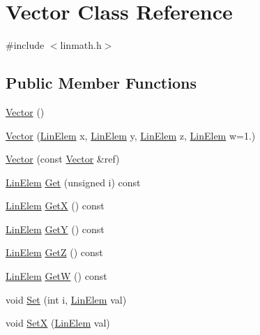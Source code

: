 \hypertarget{a00152}{\section{Vector Class Reference}
\label{a00152}
}


{\ttfamily \#include $<$linmath.\-h$>$}

\subsection*{Public Member Functions}
\begin{DoxyCompactItemize}
\item 
\hyperlink{a00152_a6f80c73b5f18dcf3f8e36065bdc8b9e5}{Vector} ()
\item 
\hyperlink{a00152_ae36366ccb7fe09f47ef0e3aa107d3c81}{Vector} (\hyperlink{a00234_a4f6e9fb2a8330a392e7819d1aef8881a}{Lin\-Elem} x, \hyperlink{a00234_a4f6e9fb2a8330a392e7819d1aef8881a}{Lin\-Elem} y, \hyperlink{a00234_a4f6e9fb2a8330a392e7819d1aef8881a}{Lin\-Elem} z, \hyperlink{a00234_a4f6e9fb2a8330a392e7819d1aef8881a}{Lin\-Elem} w=1.)
\item 
\hyperlink{a00152_a0e9df22079c419c06471c9ba92395b8f}{Vector} (const \hyperlink{a00152}{Vector} \&ref)
\item 
\hyperlink{a00234_a4f6e9fb2a8330a392e7819d1aef8881a}{Lin\-Elem} \hyperlink{a00152_ad79fa20097deb49f8a6ac88c863b357e}{Get} (unsigned i) const 
\item 
\hyperlink{a00234_a4f6e9fb2a8330a392e7819d1aef8881a}{Lin\-Elem} \hyperlink{a00152_a981719ac81abadff82a38825115c7c55}{Get\-X} () const 
\item 
\hyperlink{a00234_a4f6e9fb2a8330a392e7819d1aef8881a}{Lin\-Elem} \hyperlink{a00152_aaa7d0bd186fa37cb4ce13e06157b2c5a}{Get\-Y} () const 
\item 
\hyperlink{a00234_a4f6e9fb2a8330a392e7819d1aef8881a}{Lin\-Elem} \hyperlink{a00152_abca3521594ceadd095951c6a2374688a}{Get\-Z} () const 
\item 
\hyperlink{a00234_a4f6e9fb2a8330a392e7819d1aef8881a}{Lin\-Elem} \hyperlink{a00152_a26482795998e27f2fccd345cbd65b464}{Get\-W} () const 
\item 
void \hyperlink{a00152_a6309b8b4cd20ba0be6d486c103339e2a}{Set} (int i, \hyperlink{a00234_a4f6e9fb2a8330a392e7819d1aef8881a}{Lin\-Elem} val)
\item 
void \hyperlink{a00152_acc4fdce93fd54af9f491edaabf3ed75c}{Set\-X} (\hyperlink{a00234_a4f6e9fb2a8330a392e7819d1aef8881a}{Lin\-Elem} val)
\item 

\end{DoxyCompactItemize}
